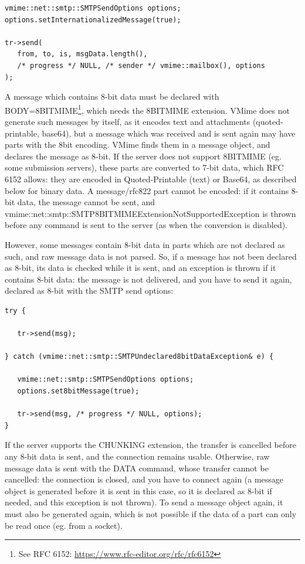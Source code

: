 \begin{lstlisting}
vmime::net::smtp::SMTPSendOptions options;
options.setInternationalizedMessage(true);

tr->send(
   from, to, is, msgData.length(),
   /* progress */ NULL, /* sender */ vmime::mailbox(), options
);
\end{lstlisting}

A message which contains 8-bit data must be declared with
{\vcode BODY=8BITMIME}\footnote{See RFC 6152: \url{https://www.rfc-editor.org/rfc/rfc6152}},
which needs the 8BITMIME extension. VMime does not generate such messages by
itself, as it encodes text and attachments (quoted-printable, base64), but
a message which was received and is sent again may have parts with the
{\vcode 8bit} encoding. VMime finds them in a message object, and declares the
message as 8-bit. If the server does not support 8BITMIME (eg. some submission
servers), these parts are converted to 7-bit data, which RFC 6152 allows: they
are encoded in Quoted-Printable (text) or Base64, as described below for binary
data. A {\vcode message/rfc822} part cannot be encoded: if it contains 8-bit
data, the message cannot be sent, and
{\vcode vmime::net::smtp::SMTP8BITMIMEExtensionNotSupportedException} is thrown
before any command is sent to the server (as when the conversion is disabled).

However, some messages contain 8-bit data in parts which are not declared as
such, and raw message data is not parsed. So, if a message has not been
declared as 8-bit, its data is checked while it is sent, and an exception is
thrown if it contains 8-bit data: the message is not delivered, and you have
to send it again, declared as 8-bit with the SMTP send options:

\begin{lstlisting}
try {

   tr->send(msg);

} catch (vmime::net::smtp::SMTPUndeclared8bitDataException& e) {

   vmime::net::smtp::SMTPSendOptions options;
   options.set8bitMessage(true);

   tr->send(msg, /* progress */ NULL, options);
}
\end{lstlisting}

If the server supports the CHUNKING extension, the transfer is cancelled
before any 8-bit data is sent, and the connection remains usable. Otherwise,
raw message data is sent with the DATA command, whose transfer cannot be
cancelled: the connection is closed, and you have to connect again (a message
object is generated before it is sent in this case, so it is declared as
8-bit if needed, and this exception is not thrown). To send a message object
again, it must also be generated again, which is not possible if the data of
a part can only be read once (eg. from a socket).


